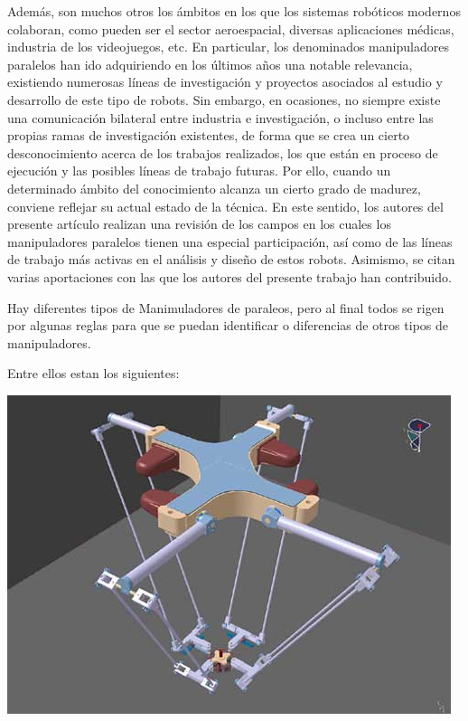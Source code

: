 \documentclass[a4paper,10pt]{article}
\begin{document}
Además, son muchos otros los ámbitos en los que los sistemas robóticos modernos colaboran, como pueden ser el sector aeroespacial, diversas aplicaciones médicas, industria de los videojuegos, etc. En particular, los denominados manipuladores paralelos han ido adquiriendo en los últimos años una notable relevancia, existiendo numerosas líneas de investigación y proyectos asociados al estudio y desarrollo de este tipo de robots. Sin embargo, en ocasiones, no siempre existe una comunicación bilateral entre industria e investigación, o incluso entre las propias ramas de investigación existentes, de forma que se crea un cierto desconocimiento acerca de los trabajos realizados, los que están en proceso de ejecución y las posibles líneas de trabajo futuras. Por ello, cuando un determinado ámbito del conocimiento alcanza un cierto grado de madurez, conviene reflejar su actual estado de la técnica. En este sentido, los autores del presente artículo realizan una revisión de los campos en los cuales los manipuladores paralelos tienen una especial participación, así como de las líneas de trabajo más activas en el análisis y diseño de estos robots. Asimismo, se citan varias aportaciones con las que los autores del presente trabajo han contribuido.

Hay diferentes tipos de Manimuladores de paraleos, pero al final todos se rigen por algunas reglas para que se puedan identificar o diferencias de otros tipos de manipuladores.

Entre ellos estan los siguientes:

\begin{center}
\includegraphics[width=\textwidth]{Imagen2.PNG}
\end{center}
\end{document}
